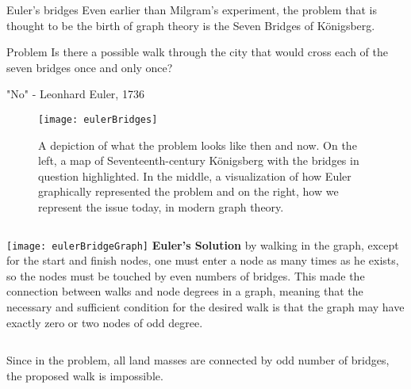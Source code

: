 \begin{frame}{Euler's bridges}
Even earlier than Milgram's experiment, the problem that is thought to be the birth of graph theory is the Seven Bridges of Königsberg.\par

\begin{block}{Problem}
Is there a possible walk through the city that would cross each of the seven bridges once and only once?\par 
"No" - Leonhard Euler, 1736
\end{block}

\begin{figure}[!h]
  \centering
  \texttt{[image: eulerBridges]}
  \caption{A depiction of what the problem looks like then and now. On the left, a map of Seventeenth-century Königsberg with the bridges in question highlighted. In the middle, a visualization of how Euler graphically represented the problem and on the right, how we represent the issue today, in modern graph theory.}
  \label{fig:eulerBridges}
\end{figure}
\end{frame}


\begin{frame}
\begin{columns}
             \centering
             \texttt{[image: eulerBridgeGraph]}
              \textbf{Euler's Solution}
by walking in the graph, except for the start and finish nodes, one must enter a node as many times as he exists, so the nodes must be touched by even numbers of bridges. This made the connection between walks and node degrees in a graph, meaning that the necessary and sufficient condition for the desired walk is that the graph may have exactly zero or two nodes of odd degree.
         \end{columns} 
         
\vspace{5mm}
         
Since in the problem, all land masses are connected by odd number of bridges, the proposed walk is impossible.\par 

\vspace{5mm}

\end{frame}



